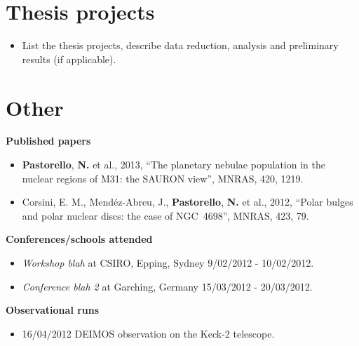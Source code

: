 \documentclass[useAMS,usenatbib,onecolumn]{mnras}
\begin{document}
\section{Thesis projects}
\label{sec:projects}

\begin{itemize}
	\item{List the thesis projects, describe data reduction, analysis and preliminary results (if applicable).}
\end{itemize}




\section{Other}
\label{sec:other}

	\noindent\textbf{Published papers}
	\begin{itemize}
  		\item{\textbf{Pastorello}, \textbf{N.} et al., 2013}, ``The planetary nebulae population in the nuclear regions of M31: the SAURON view'', MNRAS, 420, 1219.
  		\item{Corsini, E. M., Mend\'ez-Abreu, J., \textbf{Pastorello}, \textbf{N.} et al., 2012}, ``Polar bulges and polar nuclear discs: the case of NGC~4698'', MNRAS, 423, 79.
	\end{itemize}



	\noindent\textbf{Conferences/schools attended}
	\begin{itemize}
  		\item{\textit{Workshop blah}} at CSIRO, Epping, Sydney 9/02/2012 - 10/02/2012.
  		\item{\textit{Conference blah 2}} at Garching, Germany 15/03/2012 - 20/03/2012.
	\end{itemize}

	\textbf{Observational runs}
	\begin{itemize}
		\item{16/04/2012} DEIMOS observation on the Keck-2 telescope.
	\end{itemize}
\end{document}
